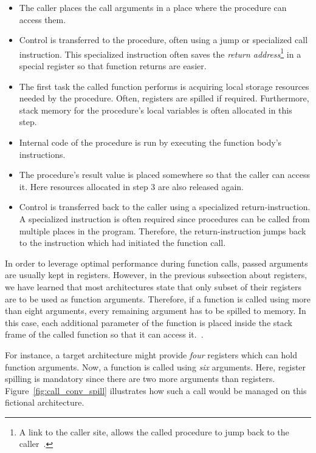 \begin{itemize}
	\item The caller places the call arguments in a place where the procedure can access them.
	\item Control is transferred to the procedure, often using a jump or specialized call instruction.
        This specialized instruction often saves the \emph{return address}\footnote{A link to the caller site, allows the called procedure to jump back to the caller~\cite[p.~99]{Patterson2017-zq}.} in a special register so that function returns are easier.
	\item The first task the called function performs is acquiring local storage resources needed by the procedure.
	      Often, registers are spilled if required.
	      Furthermore, stack memory for the procedure's local variables is often allocated in this step.
	\item Internal code of the procedure is run by executing the function body's instructions.
	\item The procedure's result value is placed somewhere so that the caller can access it.
	      Here resources allocated in step 3 are also released again.
	\item Control is transferred back to the caller using a specialized return-instruction.
	      A specialized instruction is often required since procedures can be called from multiple places in the program.
	      Therefore, the return-instruction jumps back to the instruction which had initiated the function call.
\end{itemize}

In order to leverage optimal performance during function calls, passed arguments are usually kept in registers.
However, in the previous subsection about registers, we have learned that most architectures state that only subset of their registers are to be used as function arguments.
Therefore, if a function is called using more than eight arguments, every remaining argument has to be spilled to memory.
In this case, each additional parameter of the function is placed inside the stack frame of the called function so that it can access it.~\cite[p.~98]{Patterson2017-zq}.

For instance, a target architecture might provide \emph{four} registers which can hold function arguments.
Now, a function is called using \emph{six} arguments.
Here, register spilling is mandatory since there are two more arguments than registers.
Figure~\ref{fig:call_conv_spill} illustrates how such a call would be managed on this fictional architecture.

